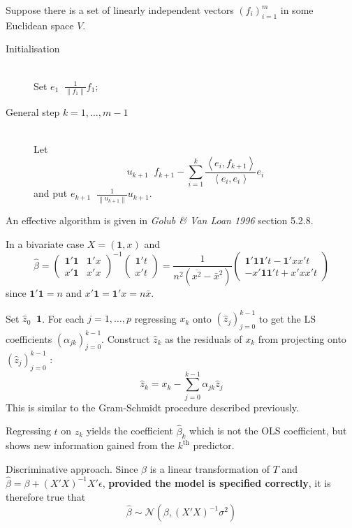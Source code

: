 \documentclass[a4paper]{article}
\newcommand{\brac}[1]{{\left ( #1 \right )}}
\newcommand{\nrm}[1]{{\left\| #1 \right \|}}
\newcommand{\brkt}[1]{{\left\langle #1 \right\rangle}}
\newcommand{\Ncal}{\mathcal{N}}
\newcommand{\one}{\mathbf{1}}
\newcommand{\defn}{\mathop{\overset{\Delta}{=}}\nolimits}
\begin{document}
Suppose there is a set of linearly independent vectors $\brac{f_i}_{i=1}^m$ in some Euclidean space $V$.
\begin{description}
	\item[Initialisation] \hfill \\
		Set $e_1 \defn \frac{1}{\nrm{f_1}} f_1$;
	\item[General step $k=1,\ldots,m-1$] \hfill \\
		Let \[u_{k+1} \defn f_{k+1} - \sum_{i=1}^k \frac{\brkt{e_i, f_{k+1}}}{\brkt{e_i,e_i}} e_i\]
		and put $e_{k+1}\defn \frac{1}{\nrm{u_{k+1}}} u_{k+1}$.
\end{description}
An effective algorithm is given in \emph{Golub \& Van Loan 1996} section 5.2.8.


In a bivariate case $X = (\one,x)$ and
\[\hat{\beta} = \brac{\begin{matrix} \one'\one & \one'x\\ x'\one & x'x \end{matrix}}^{-1} \brac{\begin{matrix} \one't \\ x't \end{matrix}}
= \frac{1}{n^2 \brac{\overline{x^2} - \bar{x}^2}} \brac{\begin{matrix} \one'\one \one't - \one'x x't \\ - x'\one \one't + x'x x't \end{matrix}}
\]
since $\one'\one = n$ and $x'\one = \one'x = n\bar{x}$.


Set $\hat{z}_0 \defn \one$. For each $j=1,\ldots,p$ regressing $x_k$ onto $\brac{\hat{z}_j}_{j=0}^{k-1}$ to get the LS coefficients $\brac{\alpha_{jk}}_{j=0}^{k-1}$.
Construct $\hat{z}_k$ as the residuals of $x_k$ from projecting onto $\brac{\hat{z}_j}_{j=0}^{k-1}$ :
\[\hat{z}_k = x_k - \sum_{j=0}^{k-1} \alpha_{jk} \hat{z}_j\]
This is similar to the Gram-Schmidt procedure described previously.

Regressing $t$ on $z_k$ yields the coefficient $\hat{\beta}_k$ which is not the OLS coefficient, but shows new information gained from the $k^\text{th}$ predictor.

Discriminative approach.
Since $\hat{\beta}$ is a linear transformation of $T$ and $\hat{\beta} = \beta + \brac{X'X}^{-1}X'\epsilon$, \textbf{provided the model is specified correctly}, it is therefore true that
\[\hat{\beta}\sim\Ncal\brac{\beta,\brac{X'X}^{-1} \sigma^2}\]
\end{document}
